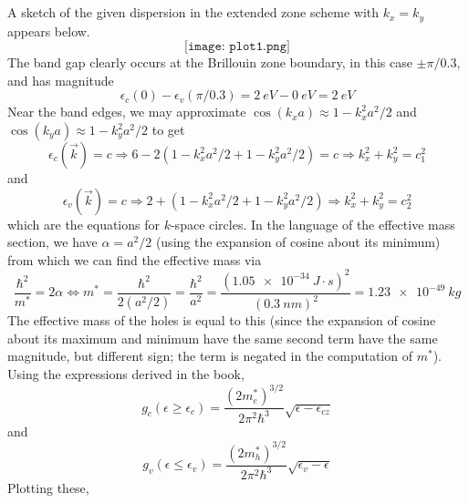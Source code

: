 \documentclass{article}
\begin{document}
\section{}
A sketch of the given dispersion in the extended zone scheme with $k_{x}=k_{y}$ appears below.
\[
  \texttt{[image: plot1.png]}
\]
The band gap clearly occurs at the Brillouin zone boundary, in this case $\pm \pi/0.3$, and has magnitude
\[
  \epsilon_{c}(0)-\epsilon_{v}(\pi/0.3)=\SI{2}{eV}-\SI{0}{eV}=\SI{2}{eV}
\]
Near the band edges, we may approximate $\cos(k_{x}a)\approx 1-k_{x}^{2}a^{2}/2$ and $\cos(k_{y}a)\approx 1-k_{y}^{2}a^{2}/2$ to get
\[
  \epsilon_{c}(\vec{k})=c\Rightarrow 6-2(1-k_{x}^{2}a^{2}/2+1-k_{y}^{2}a^{2}/2)=c
  \Rightarrow k_{x}^{2}+k_{y}^{2}=c_{1}^{2}
\]
and
\[
  \epsilon_{v}(\vec{k})=c \Rightarrow 2+(1-k_{x}^{2}a^{2}/2+1-k_{y}^{2}a^{2}/2)
  \Rightarrow k_{x}^{2}+k_{y}^{2}= c_{2}^{2}
\]
which are the equations for $k$-space circles.
In the language of the effective mass section, we have $\alpha=a^{2}/2$ (using the expansion of cosine about its minimum) from which we can find the effective mass via
\[
  \frac{\hbar^{2}}{m^{*}}=2\alpha
  \Leftrightarrow m^{*}=\frac{\hbar^{2}}{2(a^{2}/2)}=\frac{\hbar^{2}}{a^{2}}
  =\frac{(\SI{1.05e-34}{J\cdot s})^{2}}{(\SI{0.3}{nm})^{2}}
  =\SI{1.23e-49}{kg}
\]
The effective mass of the holes is equal to this (since the expansion of cosine about its maximum and minimum have the same second term
have the same magnitude, but different sign; the term is negated in the computation of $m^{*}$).
Using the expressions derived in the book,
\[
  g_{c}(\epsilon\geq \epsilon_{c})=\frac{(2m_{e}^{*})^{3/2}}{2\pi^{2}\hbar^{3}}\sqrt{\epsilon-\epsilon_{cz}}
\]
and
\[
  g_{v}(\epsilon\leq \epsilon_{v})=\frac{(2m_{h}^{*})^{3/2}}{2\pi^{2}\hbar^{3}}\sqrt{\epsilon_{v}-\epsilon}
\]
Plotting these, %
\section*{}
\end{document}
